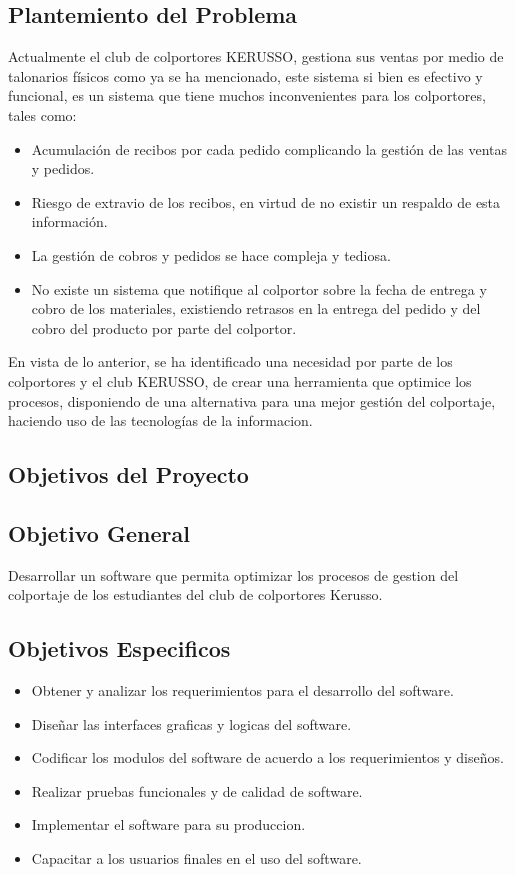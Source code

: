 \documentclass[runningheads]{llncs}
\begin{document}
\subsection{Plantemiento del Problema}
Actualmente el club de colportores KERUSSO, gestiona sus ventas por medio de talonarios físicos como ya se ha mencionado, este sistema si bien es efectivo y funcional, es un sistema que tiene muchos inconvenientes para los colportores, tales como:
\begin{itemize}
    \item Acumulación de recibos por cada pedido complicando la gestión de las ventas y pedidos. 
    \item Riesgo de extravio de los recibos, en virtud de no existir un respaldo de esta información.
    \item La gestión de cobros y pedidos se hace compleja y tediosa.
    \item No existe un sistema que notifique al colportor sobre la fecha de entrega y cobro de los materiales, existiendo retrasos en la entrega del pedido y del cobro del producto por parte del colportor.
\end{itemize}
En vista de lo anterior, se ha identificado una necesidad por parte de los colportores y el club KERUSSO, de crear una herramienta que optimice los procesos, disponiendo de una alternativa para una mejor gestión del colportaje, haciendo uso de las tecnologías de la informacion.

\subsection{Objetivos del Proyecto}
\subsection*{Objetivo General}
Desarrollar un software que permita optimizar los procesos de gestion del colportaje de los estudiantes del club de colportores Kerusso.
\subsection*{Objetivos Especificos}
\begin{itemize}
    \item Obtener y analizar los requerimientos para el desarrollo del software.
    \item Diseñar las interfaces graficas y logicas del software.
    \item Codificar los modulos del software de acuerdo a los requerimientos y diseños.
    \item Realizar pruebas funcionales y de calidad de software.
    \item Implementar el software para su produccion.
    \item Capacitar a los usuarios finales en el uso del software.
\end{itemize}
\end{document}
